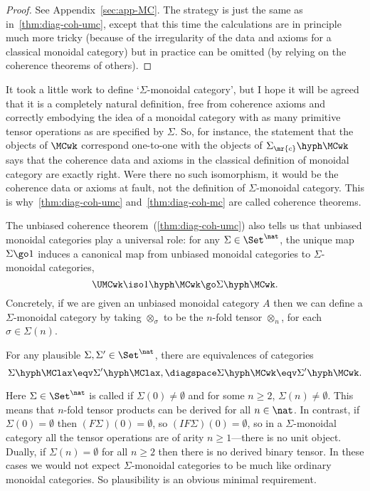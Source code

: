 \begin{proof}  
See Appendix~\ref{sec:app-MC}.  The strategy is just the same as
in~\ref{thm:diag-coh-umc}, except that this time the calculations are in
principle much more tricky (because of the irregularity of the data and
axioms for a classical monoidal category) but in practice can be omitted
(by relying on the coherence theorems of others).  \done
\end{proof}

It took a little work to define `$\Sigma$-monoidal category', but I hope it
will be agreed that it is a completely natural definition, free from
 coherence axioms and correctly embodying the idea of a
monoidal category with as many primitive tensor operations as are specified
by $\Sigma$.  So, for instance, the statement that the objects of $\MCwk$
correspond one-to-one with the objects of $\Sigma_\mr{c}\hyph\MCwk$ says
that the coherence data and axioms in the classical definition of monoidal
category are exactly right.  Were there no such isomorphism, it would be
the coherence data or axioms at fault, not the definition of
$\Sigma$-monoidal category.  This is why~\ref{thm:diag-coh-umc}
and~\ref{thm:diag-coh-mc} are called coherence theorems.

The unbiased coherence theorem~(\ref{thm:diag-coh-umc}) also tells us that
unbiased monoidal categories play a universal role: for any $\Sigma \in
\Set^\nat$, the unique map $\Sigma \go 1$ induces a canonical map from
unbiased monoidal categories to $\Sigma$-monoidal categories,
\[
\UMCwk \iso 1\hyph\MCwk \go \Sigma\hyph\MCwk.  
\]
Concretely, if we are given an unbiased monoidal category $A$ then we can
define a $\Sigma$-monoidal category by taking $\otimes_\sigma$ to be the
$n$-fold tensor $\otimes_n$, for each $\sigma\in \Sigma(n)$.

\begin{thm}	%
%
%
For any plausible $\Sigma, \Sigma' \in \Set^\nat$, there are equivalences
of categories
\[
\Sigma\hyph\MClax \eqv \Sigma'\hyph\MClax,
\diagspace
\Sigma\hyph\MCwk \eqv \Sigma'\hyph\MCwk.
\]
\end{thm}
% 
Here $\Sigma \in \Set^\nat$ is called %
%
%
if $\Sigma(0) \neq
\emptyset$ and for some $n\geq 2$, $\Sigma(n) \neq \emptyset$.  This means
that $n$-fold tensor products can be derived for all $n\in\nat$.  In
contrast, if $\Sigma(0) = \emptyset$ then $(F\Sigma)(0) = \emptyset$, so
$(IF\Sigma)(0) = \emptyset$, so in a $\Sigma$-monoidal category all the
tensor operations are of arity $n \geq 1$---there is no unit object.
Dually, if $\Sigma(n) = \emptyset$ for all $n\geq 2$ then there is no
derived binary tensor.  In these cases we would not expect
$\Sigma$-monoidal categories to be much like ordinary monoidal categories.
So plausibility is an obvious minimal requirement.

